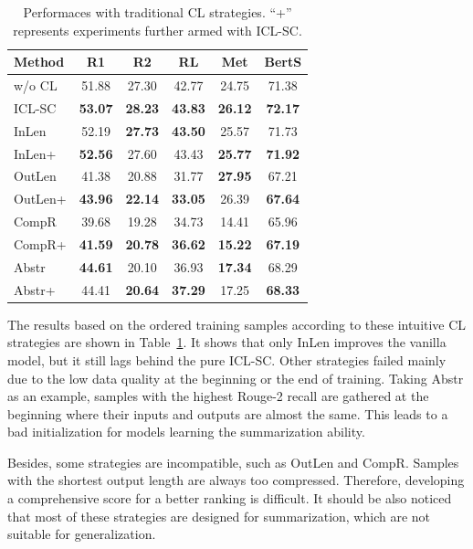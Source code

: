 \begin{table}[th]
	\scriptsize
	\centering
	\begin{tabular}{lccccc}
		\hline
		{Method} & {R1} & {R2} & {RL} & {Met} & {BertS} \\
		\hline
		w/o CL & 51.88 & 27.30 & 42.77 & 24.75 & 71.38 \\
		ICL-SC & {\textbf{53.07}} & \textbf{28.23} & \textbf{43.83} & {\textbf{26.12}}& {\textbf{72.17}} \\
		\hline
		InLen & 52.19 & \textbf{27.73} & \textbf{43.50} & 25.57 & 71.73\\
		InLen+ & \textbf{52.56} & 27.60 & 43.43 & \textbf{25.77} & \textbf{71.92}\\
		\hline
		OutLen & 41.38 & 20.88 & 31.77 & \textbf{27.95} & 67.21\\
		OutLen+ &\textbf{43.96} & \textbf{22.14} & \textbf{33.05} & 26.39 & \textbf{67.64} \\
		\hline
		CompR & 39.68 & 19.28 & 34.73 & 14.41 & 65.96 \\
		CompR+ & \textbf{41.59} & \textbf{20.78} & \textbf{36.62} & \textbf{15.22} & \textbf{67.19}\\
		\hline
		Abstr & \textbf{44.61} & 20.10 & 36.93 & \textbf{17.34} & 68.29 \\
		Abstr+ & 44.41 & \textbf{20.64} & \textbf{37.29} & 17.25 & \textbf{68.33} \\
		\hline
	\end{tabular}
	\caption{Performaces with traditional CL strategies. ``+'' represents experiments further armed with ICL-SC.}
	\label{tab:traditional}
\end{table}
The results based on the ordered training samples according to these intuitive CL strategies are shown in Table~\ref{tab:traditional}. It shows that only InLen improves the vanilla model, but it still lags behind the pure ICL-SC. Other strategies failed mainly due to the low data quality at the beginning or the end of training. 
Taking Abstr as an example, samples with the highest 
Rouge-2 recall are gathered at the beginning where 
their inputs and outputs are almost the same. 
This leads to a bad initialization for models learning 
the summarization ability. 

Besides, some strategies 
are incompatible, such as OutLen and CompR. Samples with the shortest output length are always too compressed. Therefore, developing a comprehensive score for a better ranking is difficult. It should be also noticed that most of these strategies are designed for summarization, which are not suitable for generalization.


